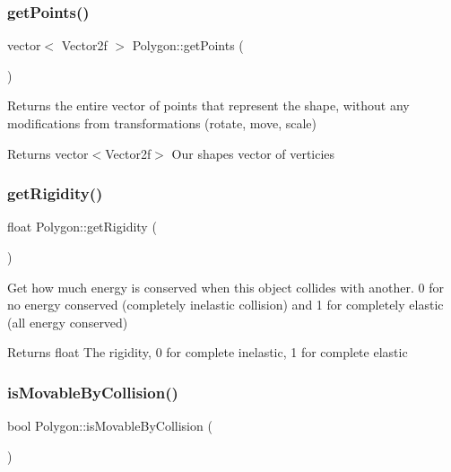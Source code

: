 \subsubsection{\texorpdfstring{getPoints()}{getPoints()}}
{\footnotesize\ttfamily vector$<$ Vector2f $>$ Polygon\+::get\+Points (\begin{DoxyParamCaption}{ }\end{DoxyParamCaption})}



Returns the entire vector of points that represent the shape, without any modifications from transformations (rotate, move, scale) 

\begin{DoxyReturn}{Returns}
vector$<$\+Vector2f$>$ Our shape\textquotesingle{}s vector of verticies 
\end{DoxyReturn}
\mbox{\label{class_polygon_a435f03ba82088fbde142d21950cfa1f3}} 
\subsubsection{\texorpdfstring{getRigidity()}{getRigidity()}}
{\footnotesize\ttfamily float Polygon\+::get\+Rigidity (\begin{DoxyParamCaption}{ }\end{DoxyParamCaption})}



Get how much energy is conserved when this object collides with another. 0 for no energy conserved (completely inelastic collision) and 1 for completely elastic (all energy conserved) 

\begin{DoxyReturn}{Returns}
float The rigidity, 0 for complete inelastic, 1 for complete elastic 
\end{DoxyReturn}
\mbox{\label{class_polygon_a83af7b70f89b8b27f5dc78f27dcd60d7}} 
\subsubsection{\texorpdfstring{isMovableByCollision()}{isMovableByCollision()}}
{\footnotesize\ttfamily bool Polygon\+::is\+Movable\+By\+Collision (\begin{DoxyParamCaption}{ }\end{DoxyParamCaption})}



